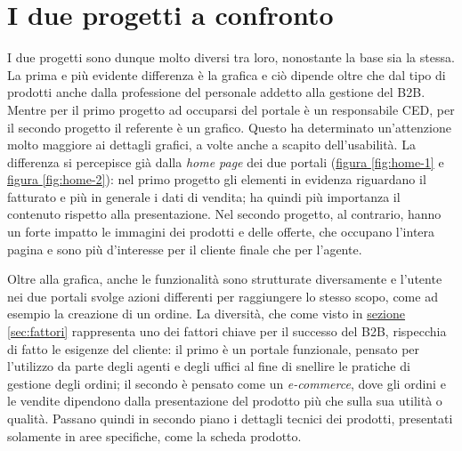 \section{I due progetti a confronto}
I due progetti sono dunque molto diversi tra loro, nonostante la base sia la stessa. La prima e più evidente differenza è la grafica e ciò dipende oltre che dal tipo di prodotti anche dalla professione del personale addetto alla gestione del B2B. Mentre per il primo progetto ad occuparsi del portale è un responsabile \Gls{CED}, per il secondo progetto il referente è un grafico. Questo ha determinato un'attenzione molto maggiore ai dettagli grafici, a volte anche a scapito dell'usabilità. La differenza si percepisce già dalla \textit{home page} dei due portali (\hyperref[fig:home-1]{figura \ref{fig:home-1}} e \hyperref[fig:home-2]{figura \ref{fig:home-2}}): nel primo progetto gli elementi in evidenza riguardano il fatturato e più in generale i dati di vendita; ha quindi più importanza il contenuto rispetto alla presentazione. Nel secondo progetto, al contrario, hanno un forte impatto le immagini dei prodotti e delle offerte, che occupano l'intera pagina e sono più d'interesse per il cliente finale che per l'agente.

Oltre alla grafica, anche le funzionalità sono strutturate diversamente e l'utente nei due portali svolge azioni differenti per raggiungere lo stesso scopo, come ad esempio la creazione di un ordine. La diversità, che come visto in \hyperref[sec:fattori]{sezione \ref{sec:fattori}} rappresenta uno dei fattori chiave per il successo del B2B, rispecchia di fatto le esigenze del cliente: il primo è un portale funzionale, pensato per l'utilizzo da parte degli agenti e degli uffici al fine di snellire le pratiche di gestione degli ordini; il secondo è pensato come un \textit{e-commerce}, dove gli ordini e le vendite dipendono dalla presentazione del prodotto più che sulla sua utilità o qualità. Passano quindi in secondo piano i dettagli tecnici dei prodotti, presentati solamente in aree specifiche, come la scheda prodotto.


